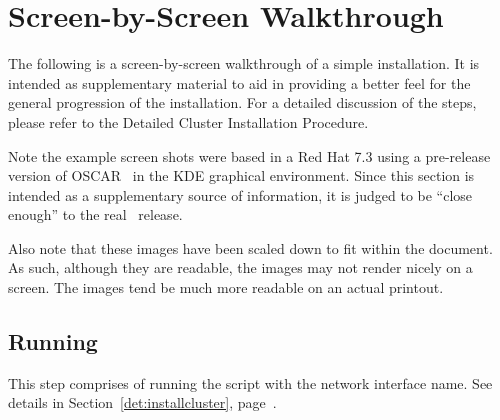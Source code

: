 %
% 
%
%
%


\newpage

\section{Screen-by-Screen Walkthrough}
\label{app:screen-by-screen}

The following is a screen-by-screen walkthrough of a simple installation.
It is intended as supplementary material to aid in providing a better feel
for the general progression of the installation.  For a detailed discussion
of the steps, please refer to the Detailed Cluster Installation Procedure. 

Note the example screen shots were based in a Red Hat 7.3 using a
pre-release version of OSCAR \oscarversion\ in the KDE graphical
environment.  Since this section is intended as a supplementary source
of information, it is judged to be ``close enough'' to the real
\oscarversion\ release.  

Also note that these images have been scaled down to fit within the
document.  As such, although they are readable, the images may not
render nicely on a screen.  The images tend be much more readable on
an actual printout.



\subsection{Running }

This step comprises of running the  script with
the network interface name.  See details in
Section~\ref{det:installcluster}, page~\pageref{det:installcluster}.


